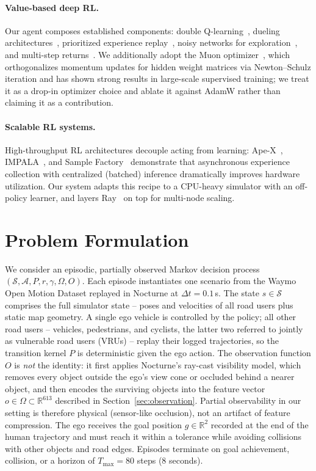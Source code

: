 \documentclass{article}
\newcommand{\R}{\mathbb{R}}
\begin{document}
\paragraph{Value-based deep RL.}
Our agent composes established components: double
Q-learning~\citep{van2016deep}, dueling
architectures~\citep{wang2016dueling}, prioritized experience
replay~\citep{schaul2015prioritized}, noisy networks for
exploration~\citep{fortunato2017noisy}, and multi-step
returns~\citep{hessel2018rainbow}. We additionally adopt the Muon
optimizer~\citep{jordan2024muon}, which orthogonalizes momentum updates for
hidden weight matrices via Newton--Schulz iteration and has shown strong
results in large-scale supervised training; we treat it as a drop-in
optimizer choice and ablate it against AdamW rather than claiming it as a
contribution.

\paragraph{Scalable RL systems.}
High-throughput RL architectures decouple acting from learning:
Ape-X~\citep{horgan2018distributed}, IMPALA~\citep{espeholt2018impala}, and
Sample Factory~\citep{petrenko2020sample} demonstrate that asynchronous
experience collection with centralized (batched) inference dramatically
improves hardware utilization. Our system adapts this recipe to a CPU-heavy
simulator with an off-policy learner, and layers Ray~\citep{moritz2018ray}
on top for multi-node scaling.

\section{Problem Formulation}
\label{sec:problem}

We consider an episodic, partially observed Markov decision process
$(\mathcal{S}, \mathcal{A}, P, r, \gamma, \Omega, O)$. Each episode
instantiates one scenario from the Waymo Open Motion Dataset replayed in
Nocturne at $\Delta t = 0.1$\,s. The state $s \in \mathcal{S}$ comprises the
full simulator state -- poses and velocities of all road users plus static
map geometry. A single ego vehicle is controlled by the policy; all other
road users -- vehicles, pedestrians, and cyclists, the latter two referred
to jointly as vulnerable road users (VRUs) -- replay their logged
trajectories, so the transition kernel $P$ is deterministic given the ego
action. The observation function $O$ is \emph{not} the identity: it first
applies Nocturne's ray-cast visibility model, which removes every object
outside the ego's view cone or occluded behind a nearer object, and then
encodes the surviving objects into the feature vector
$o \in \Omega \subset \R^{613}$ described in Section~\ref{sec:observation}.
Partial observability in our setting is therefore physical (sensor-like
occlusion), not an artifact of feature compression. The ego receives the
goal position $g \in \R^2$ recorded at the end of the human trajectory and
must reach it within a tolerance while avoiding collisions with other
objects and road edges. Episodes terminate on goal achievement, collision,
or a horizon of $T_{\max} = 80$ steps (8 seconds).
\end{document}
